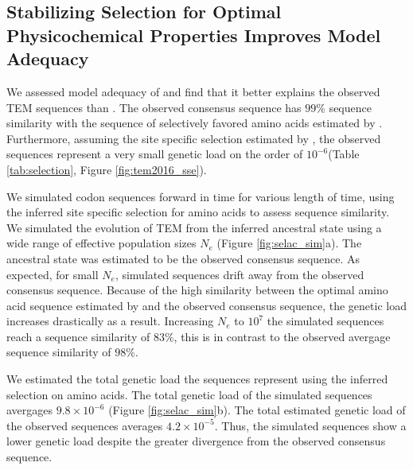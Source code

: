 \subsection{Stabilizing Selection for Optimal Physicochemical Properties Improves Model Adequacy} 
We assessed model adequacy of \selac and find that it better explains the observed TEM sequences than \phydms.
The observed consensus sequence has $99 \%$ sequence similarity with the sequence of selectively favored amino acids estimated by \selac.
Furthermore, assuming the site specific selection estimated by \selac, the observed sequences represent a very small genetic load on the order of $10^{-6}$(Table \ref{tab:selection}, Figure \ref{fig:tem2016_sse}).

We simulated codon sequences forward in time for various length of time, using the \selac inferred site specific selection for amino acids to assess sequence similarity.
We simulated the evolution of TEM from the inferred ancestral state using a wide range of effective population sizes $N_e$ (Figure \ref{fig:selac_sim}a).
The ancestral state was estimated to be the observed consensus sequence.
As expected, for small $N_e$, simulated sequences drift away from the observed consensus sequence. 
Because of the high similarity between the optimal amino acid sequence estimated by \selac and the observed consensus sequence, the genetic load increases drastically as a result.
Increasing $N_e$ to $10^7$ the simulated sequences reach a sequence similarity of $83 \%$, this is in contrast to the observed avergage sequence similarity of $98 \%$.

We estimated the total genetic load the sequences represent using the \selac inferred selection on amino acids.
The total genetic load of the simulated sequences avergages $9.8\times10^{-6}$ (Figure \ref{fig:selac_sim}b).
The total estimated genetic load of the observed sequences averages $4.2\times 10^{-5}$.
Thus, the simulated sequences show a lower genetic load despite the greater divergence from the observed consensus sequence.

